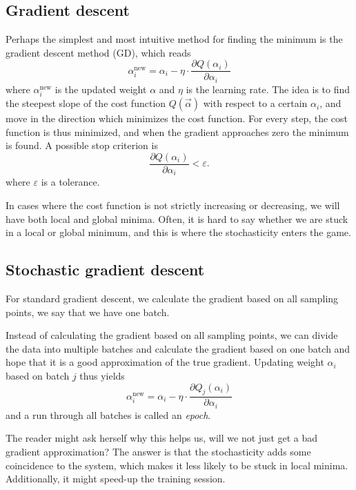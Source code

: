 \subsection{Gradient descent} \label{sec:gd}
Perhaps the simplest and most intuitive method for finding the minimum is the gradient descent method (GD), which reads
\begin{equation}
\label{eq:GD}
\alpha_i^{\text{new}}=\alpha_i - \eta\cdot\frac{\partial Q(\alpha_i)}{\partial\alpha_i}
\end{equation}
where $\alpha_i^{\text{new}}$ is the updated weight $\alpha$ and $\eta$ is the learning rate. The idea is to find the steepest slope of the cost function $Q(\vec{\alpha})$ with respect to a certain $\alpha_i$, and move in the direction which minimizes the cost function. For every step, the cost function is thus minimized, and when the gradient approaches zero the minimum is found. A possible stop criterion is
\begin{equation}
\frac{\partial Q(\alpha_i)}{\partial\alpha_i}<\varepsilon.
\end{equation}
where $\varepsilon$ is a tolerance. 

In cases where the cost function is not strictly increasing or decreasing, we will have both local and global minima. Often, it is hard to say whether we are stuck in a local or global minimum, and this is where the stochasticity enters the game.

\subsection{Stochastic gradient descent}
For standard gradient descent, we calculate the gradient based on all sampling points, we say that we have one batch. 

Instead of calculating the gradient based on all sampling points, we can divide the data into multiple batches and calculate the gradient based on one batch and hope that it is a good approximation of the true gradient. Updating weight $\alpha_i$ based on batch $j$ thus yields
\begin{equation}
\label{eq:SGD}
\alpha_i^{\text{new}}=\alpha_i - \eta\cdot\frac{\partial Q_j(\alpha_i)}{\partial\alpha_i}
\end{equation}
and a run through all batches is called an \textit{epoch}. 

The reader might ask herself why this helps us, will we not just get a bad gradient approximation? The answer is that the stochasticity adds some coincidence to the system, which makes it less likely to be stuck in local minima. Additionally, it might speed-up the training session. 

